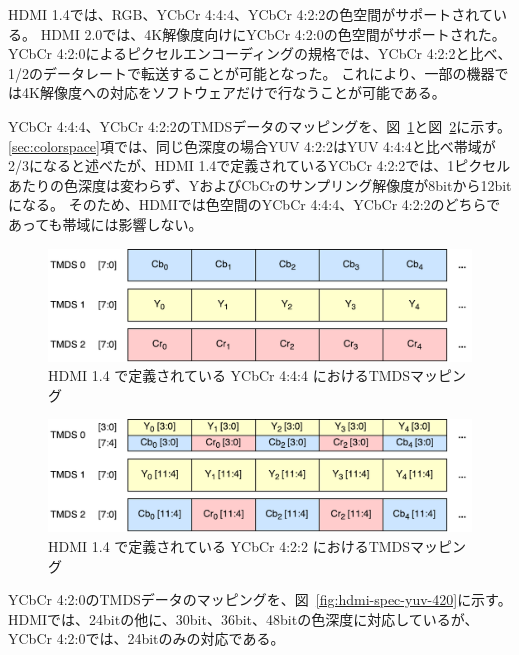 HDMI 1.4\cite{hdmi-spec-1-4}では、RGB、YCbCr 4:4:4、YCbCr 4:2:2の色空間がサポートされている。
HDMI 2.0\cite{hdmi-spec-2-0}では、4K解像度向けにYCbCr 4:2:0の色空間がサポートされた。
YCbCr 4:2:0によるピクセルエンコーディングの規格では、YCbCr 4:2:2と比べ、1/2のデータレートで転送することが可能となった。
これにより、一部の機器では4K解像度への対応をソフトウェアだけで行なうことが可能である。

YCbCr 4:4:4、YCbCr 4:2:2のTMDSデータのマッピングを、図~\ref{fig:hdmi-spec-yuv-444}と図~\ref{fig:hdmi-spec-yuv-422}に示す。
\ref{sec:colorspace}項では、同じ色深度の場合YUV 4:2:2はYUV 4:4:4と比べ帯域が2/3になると述べたが、HDMI 1.4で定義されているYCbCr 4:2:2では、1ピクセルあたりの色深度は変わらず、YおよびCbCrのサンプリング解像度が8bitから12bitになる。
そのため、HDMIでは色空間のYCbCr 4:4:4、YCbCr 4:2:2のどちらであっても帯域には影響しない。

\begin{figure}[htbp]
  \begin{center}
    \includegraphics[bb=0 0 531 141,width=13.926cm]{img/hdmi-spec-yuv-444.pdf}
  \end{center}
  \caption{HDMI 1.4 で定義されている YCbCr 4:4:4 におけるTMDSマッピング}
  \label{fig:hdmi-spec-yuv-444}
\end{figure}

\begin{figure}[htbp]
  \begin{center}
    \includegraphics[bb=0 0 531 141,width=13.926cm]{img/hdmi-spec-yuv-422.pdf}
  \end{center}
  \caption{HDMI 1.4 で定義されている YCbCr 4:2:2 におけるTMDSマッピング}
  \label{fig:hdmi-spec-yuv-422}
\end{figure}

YCbCr 4:2:0のTMDSデータのマッピングを、図~\ref{fig:hdmi-spec-yuv-420}に示す。
HDMIでは、24bitの他に、30bit、36bit、48bitの色深度に対応しているが、YCbCr 4:2:0では、24bitのみの対応である。

